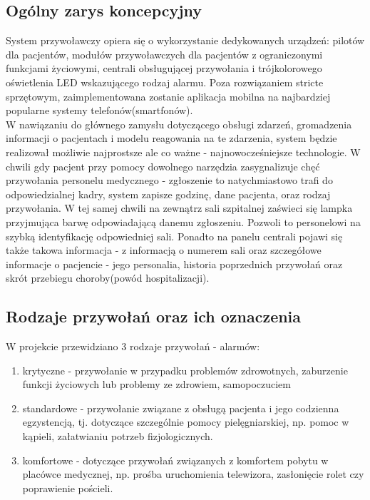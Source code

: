 \documentclass[12pt]{article} %
\begin{document}
\subsection{Ogólny zarys koncepcyjny}
System przywoławczy opiera się o wykorzystanie dedykowanych urządzeń: pilotów dla pacjentów, modułów przywoławczych dla pacjentów z ograniczonymi funkcjami życiowymi, centrali obsługującej przywołania i trójkolorowego oświetlenia LED wskazującego rodzaj alarmu. Poza rozwiązaniem stricte sprzętowym, zaimplementowana zostanie aplikacja mobilna na najbardziej popularne systemy telefonów(smartfonów).
\\
W nawiązaniu do głównego zamysłu dotyczącego obsługi zdarzeń, gromadzenia informacji o pacjentach i modelu reagowania na te zdarzenia, system będzie realizował możliwie najprostsze ale co ważne - najnowocześniejsze technologie. W chwili gdy pacjent przy pomocy dowolnego narzędzia zasygnalizuje chęć przywołania personelu medycznego - zgłoszenie to natychmiastowo trafi do odpowiedzialnej kadry, system zapisze godzinę, dane pacjenta, oraz rodzaj przywołania. W tej samej chwili na zewnątrz sali szpitalnej zaświeci się lampka przyjmująca barwę odpowiadającą danemu zgłoszeniu. Pozwoli to personelowi na szybką identyfikację odpowiedniej sali. Ponadto na panelu centrali pojawi się także takowa informacja  - z informacją o numerem sali oraz szczegółowe informacje o pacjencie - jego personalia, historia poprzednich przywołań oraz skrót przebiegu choroby(powód hospitalizacji).

\subsection{Rodzaje przywołań oraz ich oznaczenia}

W projekcie przewidziano 3 rodzaje przywołań - alarmów:
\begin{enumerate}
\item krytyczne - przywołanie w przypadku problemów zdrowotnych, zaburzenie funkcji życiowych lub problemy ze zdrowiem, samopoczuciem
\item standardowe - przywołanie związane z obsługą pacjenta i jego codzienna egzystencją, tj. dotyczące szczególnie pomocy pielęgniarskiej, np. pomoc w kąpieli, załatwianiu potrzeb fizjologicznych.
\item komfortowe - dotyczące przywołań związanych z komfortem pobytu w placówce medycznej, np. prośba uruchomienia telewizora, zasłonięcie rolet czy poprawienie pościeli.
\end{enumerate}
\end{document}
